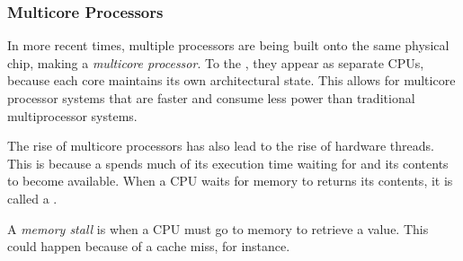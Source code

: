 \subsubsection{Multicore Processors}\label{subsubsec:Multicore_Processors}
In more recent times, multiple processors are being built onto the same physical chip, making a \emph{multicore processor}.
To the , they appear as separate CPUs, because each core maintains its own architectural state.
This allows for multicore processor systems that are faster and consume less power than traditional multiprocessor systems.

The rise of multicore processors has also lead to the rise of hardware threads.
This is because a  spends much of its execution time waiting for  and its contents to become available.
When a CPU waits for memory to returns its contents, it is called a .

\begin{definition}\label{def:Memory_Stall}
  A \emph{memory stall} is when a CPU must go to memory to retrieve a value.
  This could happen because of a cache miss, for instance.
\end{definition}

